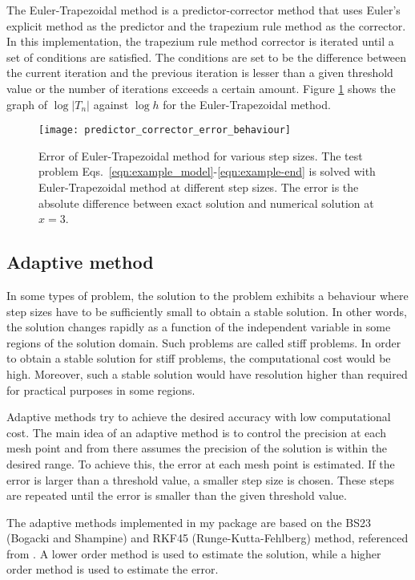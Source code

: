 The Euler-Trapezoidal method is a predictor-corrector method that uses Euler's explicit method as the predictor and the trapezium rule method as the corrector. In this implementation, the trapezium rule method corrector is iterated until a set of conditions are satisfied. The conditions are set to be the difference between the current iteration and the previous iteration is lesser than a given threshold value or the number of iterations exceeds a certain amount. Figure \ref{fig:predictor_corrector_error_behaviour} shows the graph of $\log |T_n|$ against $\log h$ for the Euler-Trapezoidal method.

\begin{figure}
    \texttt{[image: predictor\_corrector\_error\_behaviour]}
    \caption{Error of Euler-Trapezoidal method for various step sizes. The test problem Eqs.~\eqref{eqn:example_model}-\eqref{eqn:example-end} is solved with Euler-Trapezoidal method at different step sizes. The error is the absolute difference between exact solution and numerical solution at $x=3$.}
    \label{fig:predictor_corrector_error_behaviour}
\end{figure}

\subsection{Adaptive method}
\label{sec:adaptive-method}
In some types of problem, the solution to the problem exhibits a behaviour where step sizes have to be sufficiently small to obtain a stable solution. In other words, the solution changes rapidly as a function of the independent variable in some regions of the solution domain. Such problems are called stiff problems. In order to obtain a stable solution for stiff problems, the computational cost would be high. Moreover, such a stable solution would have resolution higher than required for practical purposes in some regions.

Adaptive methods try to achieve the desired accuracy with low computational cost. The main idea of an adaptive method is to control the precision at each mesh point and from there assumes the precision of the solution is within the desired range. To achieve this, the error at each mesh point is estimated. If the error is larger than a threshold value, a smaller step size is chosen. These steps are repeated until the error is smaller than the given threshold value.

The adaptive methods implemented in my package are based on the BS23 (Bogacki and Shampine) and RKF45 (Runge-Kutta-Fehlberg) method, referenced from \cite{Forsythe1977}. A lower order method is used to estimate the solution, while a higher order method is used to estimate the error. 


